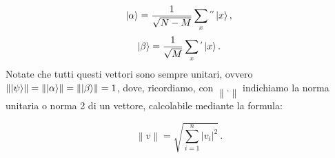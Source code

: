 \documentclass{book}
\theoremstyle{definition}
\theoremstyle{definition}
\theoremstyle{definition}
\theoremstyle{plain}
\theoremstyle{plain}
\theoremstyle{plain}
\theoremstyle{plain}
\begin{document}
\begin{displaymath}
\ket{\alpha} = \frac{1}{\sqrt{N-M}}\sum_{x}\mathop{}^{''}\ket{x},
\end{displaymath}
\begin{displaymath}
\ket{\beta} = \frac{1}{\sqrt{M}}\sum_{x}\mathop{}^{'}\ket{x}.
\end{displaymath}
Notate che tutti questi vettori sono sempre unitari, ovvero $\left\lVert \ket{\psi} \right\rVert = \left\lVert \ket{\alpha} \right\rVert = \left\lVert \ket{\beta} \right\rVert = 1$, dove, ricordiamo, con $\left\lVert . \right\rVert$ indichiamo la norma unitaria o norma 2 di un vettore, calcolabile mediante la formula:%

\begin{equation}\label{norm_two}
\left\lVert v \right\rVert = \sqrt{\sum_{i=1}^{n}\left\lvert v_{i} \right\rvert^{2}} \, .
\end{equation}

\end{document}
